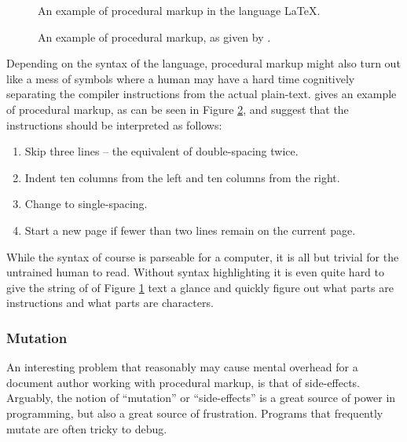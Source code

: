 \documentclass{scrreprt}
\begin{document}
\begin{figure}[h]
\centering
{}
\caption{An example of procedural markup in the language \LaTeX{}.}
\label{fig:procedural-markup-red-sentence}
\end{figure}


\begin{figure}[h]
\centering
{}
\caption{An example of procedural markup, as given by \citet{coombs}.}
\label{fig:procedural-markup-coombs}
\end{figure}



Depending on the syntax of the language, procedural markup might also turn out like a mess of symbols where a human may have a hard time cognitively separating the compiler instructions from the actual plain-text. \citet{coombs} gives an example of procedural markup, as can be seen in Figure \ref{fig:procedural-markup-coombs}, and suggest that the instructions should be interpreted as follows:

\begin{enumerate}
\item Skip three lines -- the equivalent of double-spacing twice.
\item Indent ten columns from the left and ten columns from the right.
\item Change to single-spacing.
\item Start a new page if fewer than two lines remain on the current page.
\end{enumerate}

While the syntax of course is parseable for a computer, it is all but trivial for the untrained human to read. Without syntax highlighting it is even quite hard to give the string of of Figure \ref{fig:procedural-markup-red-sentence} text a glance and quickly figure out what parts are instructions and what parts are characters.

\subsubsection{Mutation}
An interesting problem that reasonably may cause mental overhead for a document author working with procedural markup, is that of side-effects. Arguably, the notion of ``mutation'' or ``side-effects'' is a great source of power in programming, but also a great source of frustration. Programs that frequently mutate are often tricky to debug.
\end{document}
